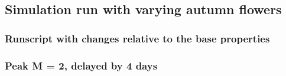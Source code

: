 \subsection{Simulation run with varying autumn flowers}
	\label{chap:sim_R2}
	\subsubsection{Runscript with changes relative to the base properties}
		
	\subsubsection{Peak M = 2, delayed by 4 days}
		\label{chap:sim_R2_1_1}
